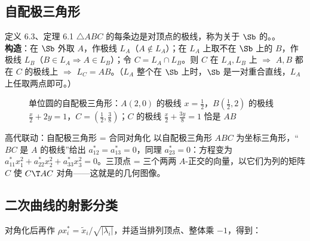 \subsection{自配极三角形}

\begin{defbox}{定义 6.3、定理 6.1}
$\triangle ABC$ 的每条边是对顶点的极线，称为关于 $\Sb$ 的。。\\[2pt]
\textbf{构造}：在 $\Sb$ 外取 $A$，作极线 $L_A$（$A\notin L_A$）；在 $L_A$ 上取不在 $\Sb$ 上的 $B$，作极线 $L_B$（$B\in L_A\Rightarrow A\in L_B$）；令 $C=L_A\cap L_B$。则 $C$ 在 $L_A,L_B$ 上 $\Rightarrow$ $A,B$ 都在 $C$ 的极线上 $\Rightarrow$ $L_C=AB$。（$L_A$ 整个在 $\Sb$ 上时，$\Sb$ 是一对重合直线，$L_A$ 上任取两点即可。）
\end{defbox}

\begin{figure}[htbp]
\centering
{}
\caption{单位圆的自配极三角形：$A(2,0)$ 的极线 $x=\frac12$，$B(\frac12,2)$ 的极线 $\frac x2+2y=1$，$C=(\frac12,\frac38)$；$C$ 的极线 $\frac x2+\frac{3y}8=1$ 恰是 $AB$}
\end{figure}

\begin{gdbox}{高代联动：自配极三角形 = 合同对角化}
以自配极三角形 $ABC$ 为坐标三角形，“$BC$ 是 $A$ 的极线”给出 $a_{12}^*=a_{13}^*=0$，同理 $a_{23}^*=0$：方程变为 $a_{11}^*x_1^2+a_{22}^*x_2^2+a_{33}^*x_3^2=0$。三顶点 = 三个两两 $A$-正交的向量，以它们为列的矩阵 $C$ 使 $C\T AC$ 对角——这就是的几何图像。
\end{gdbox}

\subsection{二次曲线的射影分类}
对角化后再作 $\rho x_i^*=\tilde x_i/\sqrt{|\lambda_i|}$，并适当排列顶点、整体乘 $-1$，得到：

